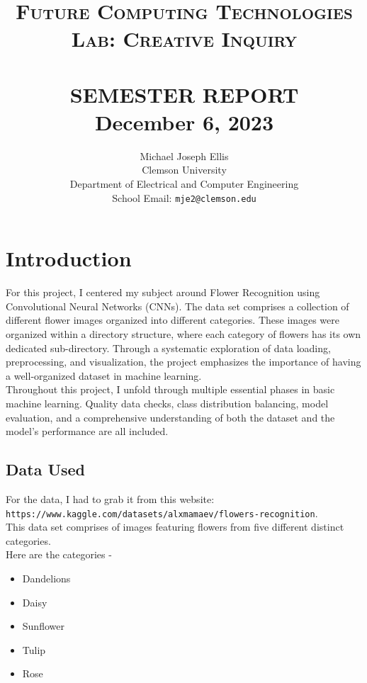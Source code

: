 \documentclass[paper=a4, fontsize=11pt,twoside]{scrartcl}
\title{
    \normalsize \textsc{Future Computing Technologies Lab: Creative Inquiry} \\ [2.0cm]
	\HRule{0.5pt} \\
	\LARGE \textbf{\uppercase{Semester Report}}
	\HRule{2pt} \\ [0.5cm]
	\normalsize December 6, 2023
}
\author{
	Michael Joseph Ellis\\	
	Clemson University\\	
	Department of Electrical and Computer Engineering\\
	School Email: \texttt{mje2@clemson.edu} \\
}
\makeatletter
\def\printtitle{
	{\centering \@title\par}}
\def\printauthor{
	{\centering \large \@author}}
\makeatother
\begin{document}
\thispagestyle{empty}

\printtitle
\vfill
\printauthor
\newpage

\setcounter{page}{1}

\section{Introduction}

For this project, I centered my subject around Flower Recognition using Convolutional Neural Networks (CNNs). The data set comprises a collection of different flower images organized into different categories. These images were organized within a directory structure, where each category of flowers has its own dedicated sub-directory. Through a systematic exploration of data loading, preprocessing, and visualization, the project emphasizes the importance of having a well-organized dataset in machine learning.\\ 

Throughout this project, I unfold through multiple essential phases in basic machine learning. Quality data checks, class distribution balancing, model evaluation, and a comprehensive understanding of both the dataset and the model's performance are all included. \\

\subsection{Data Used}

For the data, I had to grab it from this website: \\
\texttt{https://www.kaggle.com/datasets/alxmamaev/flowers-recognition}. \\

This data set comprises of images featuring flowers from five different distinct categories. \\ 
Here are the categories -

\begin{itemize}
    \item Dandelions
    \item Daisy
    \item Sunflower
    \item Tulip
    \item Rose
\end{itemize} 
\end{document}
